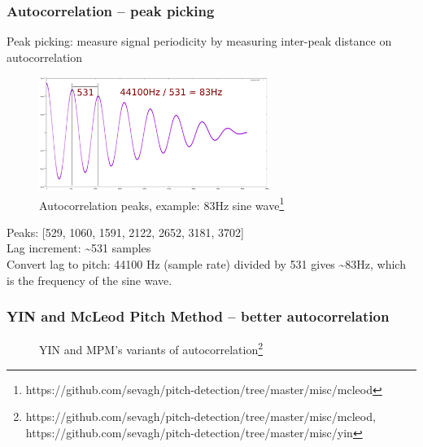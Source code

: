 \documentclass{beamer}
\begin{document}
\begin{frame}
	\frametitle{Autocorrelation -- peak picking}
	Peak picking: measure signal periodicity by measuring inter-peak distance on autocorrelation
	\begin{figure}
		\includegraphics[width=7.5cm]{./sine_autocorrelation.png}
		\caption{Autocorrelation peaks, example: 83Hz sine wave\footnote{https://github.com/sevagh/pitch-detection/tree/master/misc/mcleod}}
	\vspace{-1em}
	\end{figure}
	Peaks: [529, 1060, 1591, 2122, 2652, 3181, 3702]\\
	Lag increment: \textasciitilde531 samples\\
	Convert lag to pitch: 44100 Hz (sample rate) divided by 531 gives \textasciitilde83Hz, which is the frequency of the sine wave.
\end{frame}

\begin{frame}
	\frametitle{YIN and McLeod Pitch Method -- better autocorrelation}
	\begin{figure}
		\hspace{0.1em}
		\caption{YIN and MPM's variants of autocorrelation\footnote{https://github.com/sevagh/pitch-detection/tree/master/misc/mcleod, https://github.com/sevagh/pitch-detection/tree/master/misc/yin}}
	\end{figure}
\end{frame}
\end{document}
